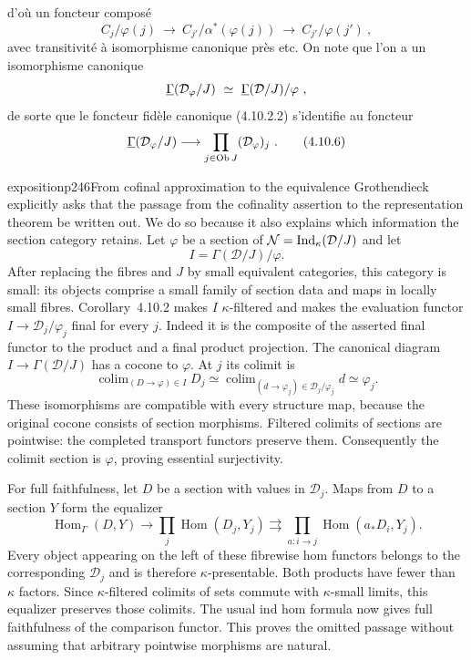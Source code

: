 
d'où un foncteur composé
\[
C_j/\varphi(j) \ \longrightarrow \ C_{j'}/\alpha^*(\varphi(j)) \ \longrightarrow \ C_{j'}/\varphi(j') \ ,
\]
avec transitivité à isomorphisme canonique près etc. On note que l'on a un isomorphisme canonique
\[
\uGamma(\mathcal{D}_\varphi/J) \ \simeq \ \uGamma(\mathcal{D}/J)/\varphi \ ,
\]
de sorte que le foncteur fidèle canonique (4.10.2.2) s'identifie au foncteur
\[
\underline{\Gamma}(\mathcal{D}_\varphi/J) \longrightarrow \prod_{j\in\operatorname{Ob} J} (\mathcal{D}_\varphi)_j \ . \tag*{(4.10.6)}
\]

\begin{dcomment}{exposition}{p246}{From cofinal approximation to the equivalence}
Grothendieck explicitly asks that the passage from the cofinality assertion to the representation theorem be written out. We do so because it also explains which information the section category retains. Let $\varphi$ be a section of $\mathcal N=\mathrm{Ind}_\kappa(\mathcal D/J)$ and let
\[
 I=\Gamma(\mathcal D/J)/\varphi.
\]
After replacing the fibres and $J$ by small equivalent categories, this category is small: its objects comprise a small family of section data and maps in locally small fibres. Corollary~4.10.2 makes $I$ $\kappa$-filtered and makes the evaluation functor $I\to\mathcal D_j/\varphi_j$ final for every $j$. Indeed it is the composite of the asserted final functor to the product and a final product projection. The canonical diagram $I\to\Gamma(\mathcal D/J)$ has a cocone to $\varphi$. At $j$ its colimit is
\[
 \mathop{\mathrm{colim}}_{(D\to\varphi)\in I}D_j
 \simeq\mathop{\mathrm{colim}}_{(d\to\varphi_j)\in\mathcal D_j/\varphi_j}d
 \simeq\varphi_j.
\]
These isomorphisms are compatible with every structure map, because the original cocone consists of section morphisms. Filtered colimits of sections are pointwise: the completed transport functors preserve them. Consequently the colimit section is $\varphi$, proving essential surjectivity.

For full faithfulness, let $D$ be a section with values in $\mathcal D_j$. Maps from $D$ to a section $Y$ form the equalizer
\[
 \operatorname{Hom}_{\Gamma}(D,Y)\longrightarrow
 \prod_j\operatorname{Hom}(D_j,Y_j)
 \rightrightarrows
 \prod_{a:i\to j}\operatorname{Hom}(a_*D_i,Y_j).
\]
Every object appearing on the left of these fibrewise hom functors belongs to the corresponding $\mathcal D_j$ and is therefore $\kappa$-presentable. Both products have fewer than $\kappa$ factors. Since $\kappa$-filtered colimits of sets commute with $\kappa$-small limits, this equalizer preserves those colimits. The usual ind hom formula now gives full faithfulness of the comparison functor. This proves the omitted passage without assuming that arbitrary pointwise morphisms are natural.


\end{dcomment}
